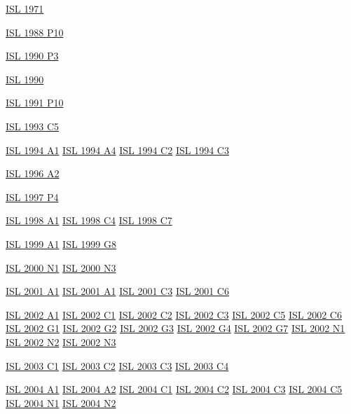 \hyperref  [problem:ISL 1971]{ISL 1971}

\hyperref  [problem:ISL 1988 P10]{ISL 1988 P10}

\hyperref  [problem:ISL 1990 P3]{ISL 1990 P3}

\hyperref  [problem:ISL 1990]{ISL 1990}

\hyperref  [problem:ISL 1991 P10]{ISL 1991 P10}

\hyperref  [problem:ISL 1993 C5]{ISL 1993 C5}

\hyperref  [problem:ISL 1994 A1]{ISL 1994 A1}
\hyperref  [problem:ISL 1994 A4]{ISL 1994 A4}
\hyperref  [problem:ISL 1994 C2]{ISL 1994 C2}
\hyperref  [problem:ISL 1994 C3]{ISL 1994 C3}

\hyperref  [problem:ISL 1996 A2]{ISL 1996 A2}

\hyperref  [problem:ISL 1997 P4]{ISL 1997 P4}

\hyperref  [problem:ISL 1998 A1]{ISL 1998 A1}
\hyperref  [problem:ISL 1998 C4]{ISL 1998 C4}
\hyperref  [problem:ISL 1998 C7]{ISL 1998 C7}

\hyperref  [problem:ISL 1999 A1]{ISL 1999 A1}
\hyperref  [problem:ISL 1999 G8]{ISL 1999 G8}

\hyperref  [problem:ISL 2000 N1]{ISL 2000 N1}
\hyperref  [problem:ISL 2000 N3]{ISL 2000 N3}

\hyperref  [problem:ISL 2001 A1]{ISL 2001 A1}
\hyperref  [problem:ISL 2001 A1]{ISL 2001 A1}
\hyperref  [problem:ISL 2001 C3]{ISL 2001 C3}
\hyperref  [problem:ISL 2001 C6]{ISL 2001 C6}

\hyperref  [problem:ISL 2002 A1]{ISL 2002 A1}
\hyperref  [problem:ISL 2002 C1]{ISL 2002 C1}
\hyperref  [problem:ISL 2002 C2]{ISL 2002 C2}
\hyperref  [problem:ISL 2002 C3]{ISL 2002 C3}
\hyperref  [problem:ISL 2002 C5]{ISL 2002 C5}
\hyperref  [problem:ISL 2002 C6]{ISL 2002 C6}
\hyperref  [problem:ISL 2002 G1]{ISL 2002 G1}
\hyperref  [problem:ISL 2002 G2]{ISL 2002 G2}
\hyperref  [problem:ISL 2002 G3]{ISL 2002 G3}
\hyperref  [problem:ISL 2002 G4]{ISL 2002 G4}
\hyperref  [problem:ISL 2002 G7]{ISL 2002 G7}
\hyperref  [problem:ISL 2002 N1]{ISL 2002 N1}
\hyperref  [problem:ISL 2002 N2]{ISL 2002 N2}
\hyperref  [problem:ISL 2002 N3]{ISL 2002 N3}

\hyperref  [problem:ISL 2003 C1]{ISL 2003 C1}
\hyperref  [problem:ISL 2003 C2]{ISL 2003 C2}
\hyperref  [problem:ISL 2003 C3]{ISL 2003 C3}
\hyperref  [problem:ISL 2003 C4]{ISL 2003 C4}

\hyperref  [problem:ISL 2004 A1]{ISL 2004 A1}
\hyperref  [problem:ISL 2004 A2]{ISL 2004 A2}
\hyperref  [problem:ISL 2004 C1]{ISL 2004 C1}
\hyperref  [problem:ISL 2004 C2]{ISL 2004 C2}
\hyperref  [problem:ISL 2004 C3]{ISL 2004 C3}
\hyperref  [problem:ISL 2004 C5]{ISL 2004 C5}
\hyperref  [problem:ISL 2004 N1]{ISL 2004 N1}
\hyperref  [problem:ISL 2004 N2]{ISL 2004 N2}

